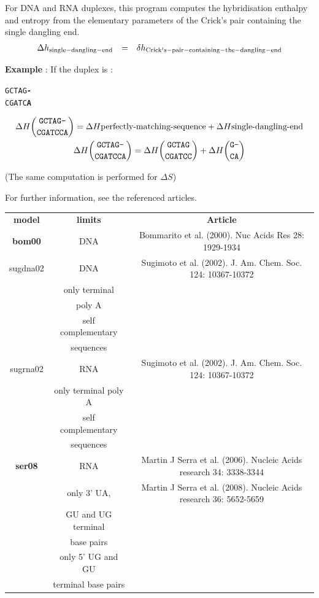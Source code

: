 \documentclass{article}
\begin{document}
For DNA and RNA duplexes, this program computes the hybridisation enthalpy and entropy from the elementary 
parameters of the Crick's pair containing the single dangling end. 
\begin{displaymath}
  \begin{array}[t]{ccc}
  \Delta{}h_\mathrm{single-dangling-end}&=&\delta{}h_\mathrm{Crick's-pair-containing-the-dangling-end}\\
  \end{array}
\end{displaymath}

\textbf{Example} :
If the duplex is :
\begin{alltt}
GCTAG\textbf{-}
CGATC\textbf{A}
\end{alltt}
\begin{multline*}
\Delta H {\mbox{\texttt{GCTAG-}} \choose \mbox{\texttt{CGATCCA}}} =
\Delta H {\mbox{perfectly-matching-sequence}} +
\Delta H {\mbox{single-dangling-end}} \\
\Delta H {\mbox{\texttt{GCTAG-}} \choose \mbox{\texttt{CGATCCA}}} =
\Delta H {\mbox{\texttt{GCTAG}} \choose \mbox{\texttt{CGATCC}}} +
\Delta H {\mbox{\texttt{G-}} \choose \mbox{\texttt{CA}}} \\
\end{multline*}


       (The same computation is performed for $\Delta S$)

For further information, see the referenced articles.

\begin{table}[h]
\begin{tabular}[h]{| c | c | c |}
\textbf{model} & \textbf{limits} & \textbf{Article} \\
\textbf{bom00} & DNA & Bommarito et al. (2000). Nuc Acids Res 28: 1929-1934 \\
sugdna02 & DNA & Sugimoto et al. (2002). J. Am. Chem. Soc. 124: 10367-10372 \\
 & only terminal & \\
 & poly A & \\
 & self complementary & \\
 & sequences & \\
sugrna02 & RNA & Sugimoto et al. (2002). J. Am. Chem. Soc. 124: 10367-10372 \\
 & only terminal poly A & \\
 & self complementary & \\
 & sequences & \\
\textbf{ser08} & RNA & Martin J Serra et al. (2006). Nucleic Acids research 34: 3338-3344 \\
 & only 3' UA, & Martin J Serra et al. (2008). Nucleic Acids research 36: 5652-5659 \\
 & GU and UG terminal & \\
 & base pairs & \\
 & only 5' UG and GU & \\
 & terminal base pairs & \\
\end{tabular}
\end{table}
\end{document}
